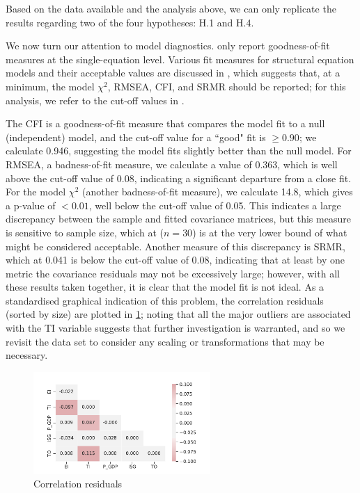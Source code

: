 \documentclass[11pt,a4paper]{article}
\begin{document}
\noindent 
Based on the data available and the analysis above, we can only replicate the results regarding two of the four hypotheses: H.1 and H.4.


We now turn our attention to model diagnostics.
\cite{panHowIndustrializationTrade2019} only report goodness-of-fit measures at the single-equation level.
Various fit measures for structural equation models and their acceptable values are discussed in \cite{klinePrinciplesPracticeStructural2016}, which suggests that, at a minimum, the model $\chi^2$, RMSEA, CFI, and SRMR should be reported; for this analysis, we refer to the cut-off values in \cite{parryFitIndicesCommonly2020}.

The CFI is a goodness-of-fit measure that compares the model fit to a null (independent) model, and the cut-off value for a ``good" fit is $\geq0.90$; we calculate 0.946, suggesting the model fits slightly better than the null model. 
For RMSEA, a badness-of-fit measure, we calculate a value of 0.363, which is well above the cut-off value of 0.08, indicating a significant departure from a close fit.
For the model $\chi^2$ (another badness-of-fit measure), we calculate 14.8, which gives a p-value of $<0.01$, well below the cut-off value of 0.05.
This indicates a large discrepancy between the sample and fitted covariance matrices, but this measure is sensitive to sample size, which at ($n=30$) is at the very lower bound of what might be considered acceptable.
Another measure of this discrepancy is SRMR, which at 0.041 is below the cut-off value of 0.08, indicating that at least by one metric the covariance residuals may not be excessively large; however, with all these results taken together, it is clear that the model fit is not ideal.
As a standardised graphical indication of this problem, the correlation residuals (sorted by size) are plotted in \cref{fig:original_corr_resid}; noting that all the major outliers are associated with the TI variable suggests that further investigation is warranted, and so we revisit the data set to consider any scaling or transformations that may be necessary.

\begin{figure}[htbp]
\centering
\includegraphics[width=0.6\textwidth]{./plots/original_correlation_residuals.pdf}
\caption{Correlation residuals}
\label{fig:original_corr_resid}
\end{figure}
\end{document}

